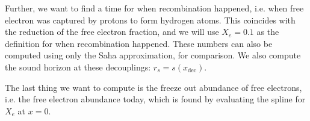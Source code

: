     Further, we want to find a time for when recombination happened, i.e. when free electron was captured by protons to form hydrogen atoms. This coincides with the reduction of the free electron fraction, and we will use $X_e=0.1$ as the definition for when recombination happened. These numbers can also be computed using only the Saha approximation, for comparison. We also compute the sound horizon at these decouplings: $r_s = s(x_\mathrm{dec})$.

    The last thing we want to compute is the freeze out abundance of free electrons, i.e. the free electron abundance today, which is found by evaluating the spline for $X_e$ at $x=0$.




